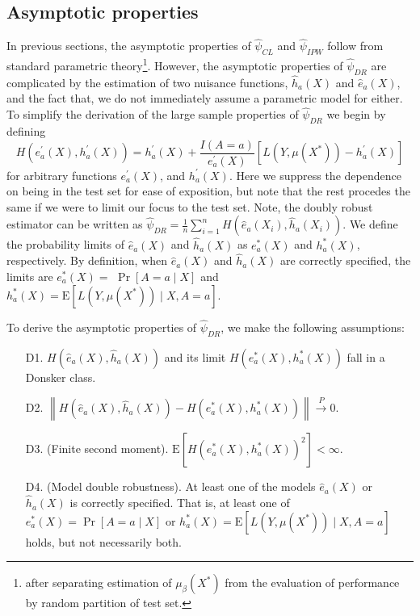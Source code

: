 \subsection{Asymptotic properties}
In previous sections, the asymptotic properties of $\widehat{\psi}_{CL}$ and $\widehat{\psi}_{IPW}$ follow from standard parametric theory\footnote{after separating estimation of $\mu_\beta(X^*)$ from the evaluation of performance by random partition of test set.}. However, the asymptotic properties of $\widehat{\psi}_{DR}$ are complicated by the estimation of two nuisance functions, $\widehat{h}_a(X)$ and $\widehat{e}_a(X)$, and the fact that, we do not immediately assume a parametric model for either. To simplify the derivation of the large sample properties of $\widehat{\psi}_{DR}$ we begin by defining
$$
H\left(e_a^{\prime}(X), h_a^{\prime}(X)\right)=h_a^{\prime}(X)+\frac{I(A = a)}{e_a^{\prime}(X)}\left[L\left(Y, \mu\left(X^*\right)\right)-h_a^{\prime}(X)\right]
$$
for arbitrary functions $e_a^{\prime}(X)$, and $h_a^{\prime}(X)$. Here we suppress the dependence on being in the test set for ease of exposition, but note that the rest procedes the same if we were to limit our focus to the test set. Note, the doubly robust estimator can be written as $\widehat{\psi}_{DR}=\frac{1}{n} \sum_{i=1}^n H\left(\widehat{e}_a\left(X_i\right), \widehat{h}_a\left(X_i\right)\right)$. We define the probability limits of $\widehat{e}_a(X)$ and $\widehat{h}_a(X)$ as $e_a^*(X)$ and $h_a^*(X)$, respectively. By definition, when $\widehat{e}_a(X)$ and $\widehat{h}_a(X)$ are correctly specified, the limits are  $e_a^*(X)=$ $\operatorname{Pr}[A=a \mid X]$ and $h^*_a(X)=\mathrm{E}\left[L\left(Y, \mu\left(X^*\right)\right) \mid X, A=a\right]$.

To derive the asymptotic properties of $\widehat{\psi}_{DR}$, we make the following assumptions:

\begin{enumerate}
    \item[D1.] $H(\widehat{e}_a(X), \widehat{h}_a(X))$ and its limit $H\left(e^*_a(X), h^*_a(X)\right)$ fall in a Donsker class.
    \item[D2.]  $\left\|H(\widehat{e}_a(X), \widehat{h}_a(X))-H\left(e^*_a(X), h^*_a(X)\right)\right\| \stackrel{P}{\longrightarrow} 0$.
    \item[D3.] (Finite second moment). $\mathrm{E}\left[H\left(e^*_a(X), h^*_a(X)\right)^2\right]<\infty$.
    \item[D4.] (Model double robustness). At least one of the models $\widehat{e}_a(X)$ or $\widehat{h}_a(X)$ is correctly specified. That is, at least one of $e^*_a(X)=\operatorname{Pr}[A=a \mid X]$ or $h^*_a(X)=\mathrm{E}\left[L\left(Y, \mu\left(X^*\right)\right) \mid X, A=a\right]$ holds, but not necessarily both.
\end{enumerate}

